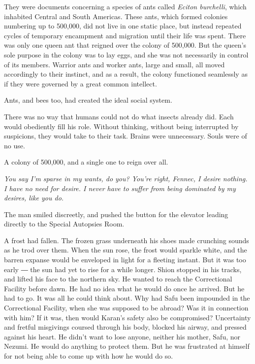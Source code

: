 They were documents concerning a species of ants called \emph{Eciton
burchelli}, which inhabited Central and South Americas. These ants, which
formed colonies numbering up to 500,000, did not live in one static
place, but instead repeated cycles of temporary encampment and migration
until their life was spent. There was only one queen ant that reigned
over the colony of 500,000. But the queen's sole purpose in the colony
was to lay eggs, and she was not necessarily in control of its members.
Warrior ants and worker ants, large and small, all moved accordingly to
their instinct, and as a result, the colony functioned seamlessly as if
they were governed by a great common intellect.

Ants, and bees too, had created the ideal social system.

There was no way that humans could not do what insects already did. Each
would obediently fill his role. Without thinking, without being
interrupted by suspicions, they would take to their task. Brains were
unnecessary. Souls were of no use.

A colony of 500,000, and a single one to reign over all.

\emph{You say I'm sparse in my wants, do you? You're right, Fennec, I desire
nothing. I have no need for desire. I never have to suffer from being
dominated by my desires, like you do.}

The man smiled discreetly, and pushed the button for the elevator
leading directly to the Special Autopsies Room.

\mybreak

A frost had fallen. The frozen grass underneath his shoes made crunching
sounds as he trod over them. When the sun rose, the frost would sparkle
white, and the barren expanse would be enveloped in light for a fleeting
instant. But it was too early ― the sun had yet to rise for a while
longer. Shion stopped in his tracks, and lifted his face to the northern
sky. He wanted to reach the Correctional Facility before dawn. He had no
idea what he would do once he arrived. But he had to go. It was all he
could think about. Why had Safu been impounded in the Correctional
Facility, when she was supposed to be abroad? Was it in connection with
him? If it was, then would Karan's safety also be compromised?
Uncertainty and fretful misgivings coursed through his body, blocked his
airway, and pressed against his heart. He didn't want to lose anyone,
neither his mother, Safu, nor Nezumi. He would do anything to protect
them. But he was frustrated at himself for not being able to come up
with how he would do so.

